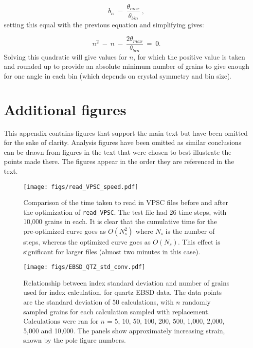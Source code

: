\documentclass[a4paper,12pt,twoside]{report}
\numberwithin{equation}{chapter}
\begin{document}
\begin{equation} \label{App:eq:nbins}
b_n\ =\ \frac{\theta_{max}}{\theta_{bin}}\ ,
\end{equation}
\noindent
setting this equal with the previous equation and simplifying gives:

\begin{equation}
n^2\ -\ n\ -\ \frac{2\theta_{max}}{\theta_{bin}}\ =\ 0.
\end{equation}
\noindent
Solving this quadratic will give values for $n$, for which the positive value is taken and rounded up to provide an absolute minimum number of grains to give enough for one angle in each bin (which depends on crystal symmetry and bin size).

\newpage
\section{Additional figures} \label{App:analysis_figs}
This appendix contains figures that support the main text but have been omitted for the sake of clarity. Analysis figures have been omitted as similar conclusions can be drawn from figures in the text that were chosen to best illustrate the points made there. The figures appear in the order they are referenced in the text.
\\

\begin{figure}[h!]
  \centering
    \texttt{[image: figs/read\_VPSC\_speed.pdf]}
  \caption[Read VPSC optimization]{Comparison of the time taken to read in VPSC files before and after the optimization of \texttt{read\_{}VPSC}. The test file had 26 time steps, with 10,000 grains in each. It is clear that the cumulative time for the pre-optimized curve goes as $O(N_s^2)$ where $N_s$ is the number of steps, whereas the optimized curve goes as $O(N_s)$. This effect is significant for larger files (almost two minutes in this case).}
  \label{fig:app:read_VPSC}
\end{figure} 

\begin{figure}[h!]
  \centering
    \texttt{[image: figs/EBSD\_QTZ\_std\_conv.pdf]}
  \caption[Index error with no. grains (quartz EBSD)]{Relationship between index standard deviation and number of grains used for index calculation, for quartz EBSD data. The data points are the standard deviation of 50 calculations, with $n$ randomly sampled grains for each calculation sampled with replacement. Calculations were ran for $n$ = 5, 10, 50, 100, 200, 500, 1,000, 2,000, 5,000 and 10,000. The panels show approximately increasing strain, shown by the pole figure numbers.}
  \label{fig:app:QTZ_EBSD_n_conv_err}
\end{figure}
\end{document}
